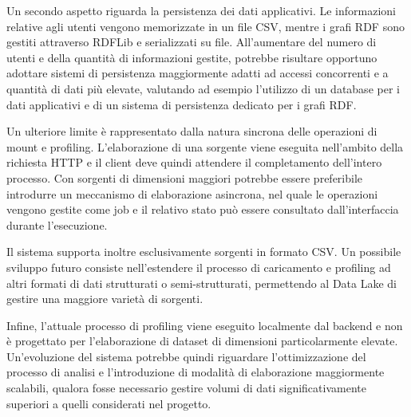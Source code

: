 \documentclass[13.6pt,a4paper]{report}
\begin{document}
\noindent
Un secondo aspetto riguarda la persistenza dei dati applicativi. Le informazioni relative agli utenti vengono memorizzate in un file CSV, mentre i grafi RDF sono gestiti attraverso RDFLib e serializzati su file. All'aumentare del numero di utenti e della quantità di informazioni gestite, potrebbe risultare opportuno adottare sistemi di persistenza maggiormente adatti ad accessi concorrenti e a quantità di dati più elevate, valutando ad esempio l'utilizzo di un database per i dati applicativi e di un sistema di persistenza dedicato per i grafi RDF.

\noindent
Un ulteriore limite è rappresentato dalla natura sincrona delle operazioni di mount e profiling. L'elaborazione di una sorgente viene eseguita nell'ambito della richiesta HTTP e il client deve quindi attendere il completamento dell'intero processo. Con sorgenti di dimensioni maggiori potrebbe essere preferibile introdurre un meccanismo di elaborazione asincrona, nel quale le operazioni vengono gestite come job e il relativo stato può essere consultato dall'interfaccia durante l'esecuzione.

\noindent
Il sistema supporta inoltre esclusivamente sorgenti in formato CSV. Un possibile sviluppo futuro consiste nell'estendere il processo di caricamento e profiling ad altri formati di dati strutturati o semi-strutturati, permettendo al Data Lake di gestire una maggiore varietà di sorgenti.

\noindent
Infine, l'attuale processo di profiling viene eseguito localmente dal backend e non è progettato per l'elaborazione di dataset di dimensioni particolarmente elevate. Un'evoluzione del sistema potrebbe quindi riguardare l'ottimizzazione del processo di analisi e l'introduzione di modalità di elaborazione maggiormente scalabili, qualora fosse necessario gestire volumi di dati significativamente superiori a quelli considerati nel progetto.
\end{document}
